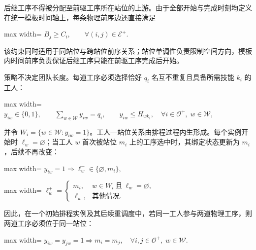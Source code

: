 \documentclass[journal,10pt]{IEEEtran}
\begin{document}
后继工序不得被分配至前驱工序所在站位的上游。由于全部开始与完成时刻均定义在统一模板时间轴上，每条物理前序边还直接满足

\begin{center}
\begin{adjustbox}{max width=\columnwidth}
$\displaystyle
B_j\ge C_i,
\qquad \forall(i,j)\in\mathcal E^+.
$
\end{adjustbox}
\end{center}

该约束同时适用于同站位与跨站位前序关系；站位单调性负责限制空间方向，模板内时间前序负责保证后继工序只能在前驱工序完成后开始。

策略不决定团队长度。每道工序必须选择恰好 \(q_i\) 名互不重复且具备所需技能 \(k_i\) 的工人：

\begin{center}
\begin{adjustbox}{max width=\columnwidth}
$\displaystyle
y_{iw}\in\{0,1\},\qquad
\sum_{w\in\mathcal{W}}y_{iw}=q_i,\qquad
y_{iw}\le H_{w k_i},
\quad \forall i\in\mathcal{O}^{+},\;w\in\mathcal{W},
$
\end{adjustbox}
\end{center}

并令 \(W_i=\lbrace{}w\in\mathcal{W}:y_{iw}=1\rbrace{}\)。工人---站位关系由排程过程内生形成。每个实例开始时 \(\ell_w=\varnothing\)；当工人 \(w\) 首次被站位 \(m_i\) 上的工序选中时，其绑定状态更新为 \(m_i\)，后续不再改变：

\begin{center}
\begin{adjustbox}{max width=\columnwidth}
$\displaystyle
y_{iw}=1\Longrightarrow \ell_w^{-}\in\{\varnothing,m_i\},
$
\end{adjustbox}
\end{center}

\begin{center}
\begin{adjustbox}{max width=\columnwidth}
$\displaystyle
\ell_w^{+}=
\begin{cases}
m_i, & w\in W_i\ \text{且}\ \ell_w=\varnothing,\\
\ell_w, & \text{其他情况}.
\end{cases}
$
\end{adjustbox}
\end{center}

因此，在一个初始排程实例及其后续重调度中，若同一工人参与两道物理工序，则两道工序必须位于同一站位：

\begin{center}
\begin{adjustbox}{max width=\columnwidth}
$\displaystyle
y_{iw}=y_{jw}=1\Longrightarrow m_i=m_j,
\quad \forall i,j\in\mathcal{O}^{+},\;w\in\mathcal{W}.
$
\end{adjustbox}
\end{center}
\end{document}
